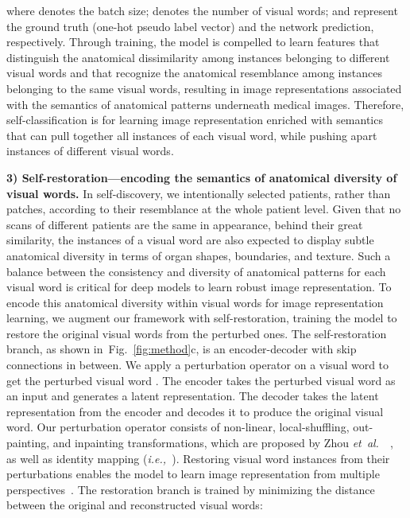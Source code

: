 \documentclass[journal,twoside,web]{ieeecolor}
\def\figurename{Fig.}
\newcommand{\etal}{\mbox{\emph{et al.\ }}}
\newcommand{\ie}{\mbox{\emph{i.e.,\ }}}
\begin{document}
where  denotes the batch size;  denotes the number of visual words;  and  represent the ground truth (one-hot pseudo label vector) and the network prediction, respectively. Through training, the model is compelled to learn features that distinguish the anatomical dissimilarity among instances belonging to different visual words and that recognize the anatomical resemblance among instances belonging to the same visual words, resulting in image representations associated with the semantics of anatomical patterns underneath medical images. Therefore, self-classification is for learning image representation enriched with semantics that can pull together all instances of each visual word, while pushing apart instances of different visual words.




\medskip
\noindent\textbf{3) Self-restoration---encoding the semantics of anatomical diversity of visual words.}
\label{sec:vw_restoration}
In self-discovery,  we intentionally selected patients, rather than patches, according to their resemblance at the whole patient level. Given that no scans of different patients are the same in appearance, behind their great similarity, the instances of a visual word are also expected to display subtle anatomical diversity in terms of organ shapes, boundaries, and texture. Such a balance between the consistency and diversity of anatomical patterns for each visual word is critical for deep models to learn robust image representation. To encode this anatomical diversity within visual words for image representation learning, we augment our framework with self-restoration, training the model to restore the original visual words from the perturbed ones. 
The self-restoration branch, as shown in~\figurename~\ref{fig:method}c, is an encoder-decoder with skip connections in between. 
We apply a perturbation operator  on a visual word  to get the perturbed visual word .  The encoder takes the perturbed visual word   as an input and generates a latent representation. The decoder takes the latent representation from the encoder and decodes it to produce the original visual word. 
Our perturbation operator  consists of non-linear, local-shuffling, out-painting, and inpainting transformations, which are proposed by Zhou \etal~\cite{zhou2019models,zhou2021models}, as well as identity mapping (\ie ).  Restoring visual word instances from their perturbations enables the model to learn image representation from multiple perspectives~\cite{zhou2019models,zhou2021models}.  
The restoration branch is trained by minimizing the  distance between the original and reconstructed visual words: 
\end{document}
